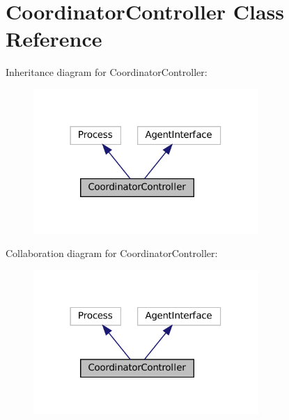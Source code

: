 \hypertarget{classCoordinatorController}{}\section{Coordinator\+Controller Class Reference}
\label{classCoordinatorController}


Inheritance diagram for Coordinator\+Controller\+:
\nopagebreak
\begin{figure}[H]
\begin{center}
\leavevmode
\includegraphics[width=242pt]{classCoordinatorController__inherit__graph}
\end{center}
\end{figure}


Collaboration diagram for Coordinator\+Controller\+:
\nopagebreak
\begin{figure}[H]
\begin{center}
\leavevmode
\includegraphics[width=242pt]{classCoordinatorController__coll__graph}
\end{center}
\end{figure}
